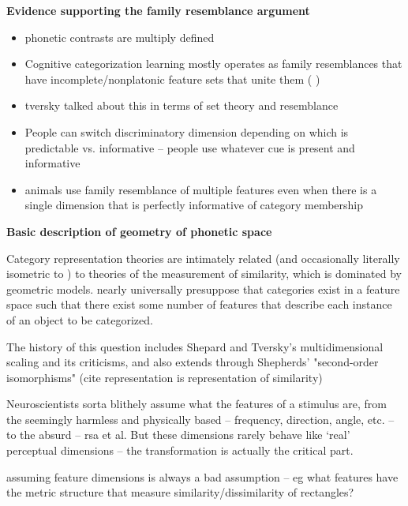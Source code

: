 \begin{multicols}{2}
\textbf{Evidence supporting the family resemblance argument}
\begin{itemize}
	\item phonetic contrasts are multiply defined\cite{Lisker1977,Bailey1980}
	\item Cognitive categorization learning mostly operates as family resemblances that have incomplete/nonplatonic feature sets that unite them (\cite{roschFamilyResemblancesStudies1975}\cite{roschWittgensteinCategorizationResearch1987} \cite{couchmanRulesResemblanceTheir2010})
	\item tversky talked about this in terms of set theory and resemblance \cite{tverskyStudiesSimilarity1978} \cite{Tversky1970}
	\item People can switch discriminatory dimension depending on which is predictable vs. informative -- people use whatever cue is present and informative \cite{kiefteAbsorptionReliableSpectral2008}
	\item animals use family resemblance of multiple features even when there is a single dimension that is perfectly informative of category membership \cite{leaUseMultipleDimensions2008, couchmanRulesResemblanceTheir2010}

\end{itemize}

\textbf{Basic description of geometry of phonetic space}


Category representation theories are intimately related (and occasionally literally isometric to \cite{Edelman1998}) to theories of the measurement of similarity, which is dominated by geometric models\cite{Tversky1977}. nearly universally presuppose that categories exist in a feature space such that there exist some number of features that describe each instance of an object to be categorized.

The history of this question includes Shepard and Tversky's multidimensional scaling and its criticisms, and also extends through Shepherds' "second-order isomorphisms" (cite representation is representation of similarity)

Neuroscientists sorta blithely assume what the features of a stimulus are, from the seemingly harmless and physically based -- frequency, direction, angle, etc. -- to the absurd -- rsa et al. But these dimensions rarely behave like `real' perceptual dimensions \cite{krantzSimilarityRectanglesAnalysis1975a} -- the transformation is actually the critical part. 

assuming feature dimensions is always a bad assumption -- eg what features have the metric structure that measure similarity/dissimilarity of rectangles? \cite{krantzSimilarityRectanglesAnalysis1975a}



\end{multicols}
